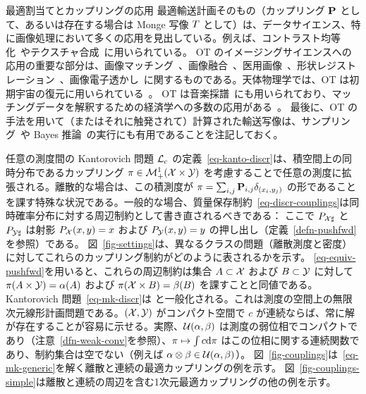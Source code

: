 \begin{rem1}{最適割当てとカップリングの応用}
最適輸送計画そのもの（カップリング $\P$ として、あるいは存在する場合は Monge 写像 $\T$ として）は、データサイエンス、特に画像処理において多くの応用を見出している。例えば、コントラスト均等化~\citep{delon2004midway}やテクスチャ合成~\citet{gutierrez2017optimal}に用いられている。
%
OT のイメージングサイエンスへの応用の重要な部分は、画像マッチング~\citep{zhu2007image,wang2013linear,museyko2009application,li2013novel}、画像融合~\citep{courty2016optimal}、医用画像~\citep{wang2011optimal}、形状レジストレーション~\citep{makihara2010earth,lai2014multi,su2015optimal}、画像電子透かし~\citep{mathon2014optimal}に関するものである。天体物理学では、OT は初期宇宙の復元に用いられている~\citep{FrischNaturee}。
%
OT は音楽採譜~\citep{flamary2016optimal}にも用いられており、マッチングデータを解釈するための経済学への多数の応用がある~\citep{galichon2016optimal}。
%
最後に、OT の手法を用いて（またはそれに触発されて）計算された輸送写像は、サンプリング~\citep{reich2013nonparametric,oliver2014minimization}や Bayes 推論~\citep{kim2013efficient,el2012bayesian}の実行にも有用であることを注記しておく。
\end{rem1}


\begin{rem2}{任意の測度間の Kantorovich 問題} $\MK_\c$ の定義~\eqref{eq-kanto-discr}は、積空間上の同時分布であるカップリング $\pi \in \Mm_+^1(\X \times \Y)$ を考慮することで任意の測度に拡張される。離散的な場合は、この積測度が $\pi = \sum_{i,j} \P_{i,j} \de_{(x_i,y_j)}$ の形であることを課す特殊な状況である。一般的な場合、質量保存制約~\eqref{eq-discr-couplings}は同時確率分布に対する周辺制約として書き直されるべきである：
ここで $P_{\X\sharp}$ と $P_{\Y\sharp}$ は射影 $P_\X(x,y)=x$ および $P_\Y(x,y)=y$ の押し出し（定義~\ref{defn-pushfwd}を参照）である。
%
図~\ref{fig-settings}は、異なるクラスの問題（離散測度と密度）に対してこれらのカップリング制約がどのように表されるかを示す。
%
\eqref{eq-equiv-pushfwd}を用いると、これらの周辺制約は集合 $A \subset \X$ および $B \subset \Y$ に対して $\pi(A \times \Y)=\al(A)$ および $\pi(\X \times B)=\be(B)$ を課すことと同値である。
%
Kantorovich 問題~\eqref{eq-mk-discr}は
と一般化される。これは測度の空間上の無限次元線形計画問題である。$(\X,\Y)$ がコンパクト空間で $c$ が連続ならば、常に解が存在することが容易に示せる。実際、$\Couplings(\al,\be)$ は測度の弱位相でコンパクトであり（注意~\ref{dfn-weak-conv}を参照）、$\pi \mapsto \int c \d\pi$ はこの位相に関する連続関数であり、制約集合は空でない（例えば $\al \otimes \be \in \Couplings(\al,\be)$）。
%
図~\ref{fig-couplings}は~\eqref{eq-mk-generic}を解く離散と連続の最適カップリングの例を示す。
%
図~\ref{fig-couplings-simple}は離散と連続の周辺を含む1次元最適カップリングの他の例を示す。
\end{rem2}

